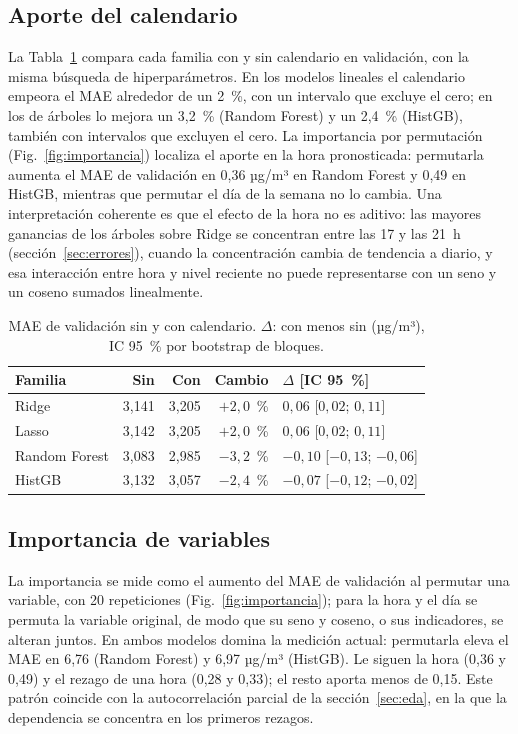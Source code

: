 \subsection{Aporte del calendario}
\label{sec:calendario}
La Tabla~\ref{tab:calendario} compara cada familia con y sin calendario en validación, con la misma búsqueda de hiperparámetros. En los modelos lineales el calendario empeora el MAE alrededor de un 2~\%, con un intervalo que excluye el cero; en los de árboles lo mejora un 3,2~\% (Random Forest) y un 2,4~\% (HistGB), también con intervalos que excluyen el cero. La importancia por permutación (Fig.~\ref{fig:importancia}) localiza el aporte en la hora pronosticada: permutarla aumenta el MAE de validación en 0,36 µg/m³ en Random Forest y 0,49 en HistGB, mientras que permutar el día de la semana no lo cambia. Una interpretación coherente es que el efecto de la hora no es aditivo: las mayores ganancias de los árboles sobre Ridge se concentran entre las 17 y las 21~h (sección~\ref{sec:errores}), cuando la concentración cambia de tendencia a diario, y esa interacción entre hora y nivel reciente no puede representarse con un seno y un coseno sumados linealmente.

\begin{table}[t]
\centering
\caption{MAE de validación sin y con calendario. $\Delta$: con menos sin (µg/m³), IC 95~\% por bootstrap de bloques.}
\label{tab:calendario}
\small
\setlength{\tabcolsep}{3pt}
\begin{tabular}{@{}lrrrl@{}}
\toprule
Familia & Sin & Con & Cambio & $\Delta$ [IC 95~\%] \\
\midrule
Ridge & 3,141 & 3,205 & $+2{,}0$~\% & $0{,}06$ [$0{,}02$; $0{,}11$] \\
Lasso & 3,142 & 3,205 & $+2{,}0$~\% & $0{,}06$ [$0{,}02$; $0{,}11$] \\
Random Forest & 3,083 & 2,985 & $-3{,}2$~\% & $-0{,}10$ [$-0{,}13$; $-0{,}06$] \\
HistGB & 3,132 & 3,057 & $-2{,}4$~\% & $-0{,}07$ [$-0{,}12$; $-0{,}02$] \\
\bottomrule
\end{tabular}
\end{table}

\subsection{Importancia de variables}
\label{sec:importancia}
La importancia se mide como el aumento del MAE de validación al permutar una variable, con 20 repeticiones (Fig.~\ref{fig:importancia}); para la hora y el día se permuta la variable original, de modo que su seno y coseno, o sus indicadores, se alteran juntos. En ambos modelos domina la medición actual: permutarla eleva el MAE en 6,76 (Random Forest) y 6,97 µg/m³ (HistGB). Le siguen la hora (0,36 y 0,49) y el rezago de una hora (0,28 y 0,33); el resto aporta menos de 0,15. Este patrón coincide con la autocorrelación parcial de la sección~\ref{sec:eda}, en la que la dependencia se concentra en los primeros rezagos.

